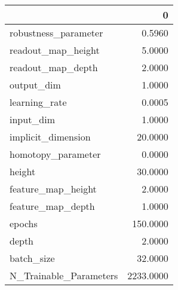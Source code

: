 \begin{tabular}{lr}
\toprule
{} &          0 \\
\midrule
robustness\_parameter   &     0.5960 \\
readout\_map\_height     &     5.0000 \\
readout\_map\_depth      &     2.0000 \\
output\_dim             &     1.0000 \\
learning\_rate          &     0.0005 \\
input\_dim              &     1.0000 \\
implicit\_dimension     &    20.0000 \\
homotopy\_parameter     &     0.0000 \\
height                 &    30.0000 \\
feature\_map\_height     &     2.0000 \\
feature\_map\_depth      &     1.0000 \\
epochs                 &   150.0000 \\
depth                  &     2.0000 \\
batch\_size             &    32.0000 \\
N\_Trainable\_Parameters &  2233.0000 \\
\bottomrule
\end{tabular}
